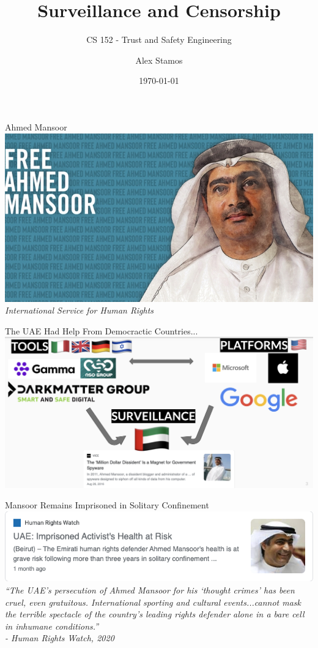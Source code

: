\documentclass[nobackground,dvipsnames,table]{beamer}
\title{Surveillance and Censorship}
\subtitle{CS 152 - Trust and Safety Engineering}
\author[A. Stamos]{Alex Stamos}
\institute[Stanford University]{Stanford Cyber Policy Center}
\date[2022]{\today}
\begin{document}
\coverpage

\begin{frame}
    \titlepage
\end{frame}

\begin{frame}{Ahmed Mansoor}
    \includegraphics[width=\textwidth]{free-ahmed-mansoor}
    \textit{International Service for Human Rights}
\end{frame}

\begin{frame}{The UAE Had Help From Democractic Countries...}
    \includegraphics[width=\textwidth]{uae-help}
\end{frame}

\begin{frame}{Mansoor Remains Imprisoned in Solitary Confinement}
    \centering
    \includegraphics[width=\textwidth]{mansoor-health-at-risk}
    \textit{“The UAE’s persecution of Ahmed Mansoor for his ‘thought crimes’ has been cruel, even gratuitous. International sporting and cultural events...cannot mask the terrible spectacle of the country’s leading rights defender alone in a bare cell in inhumane conditions.”}\\
    \small{\textit{- Human Rights Watch, 2020}}
\end{frame}
\end{document}
